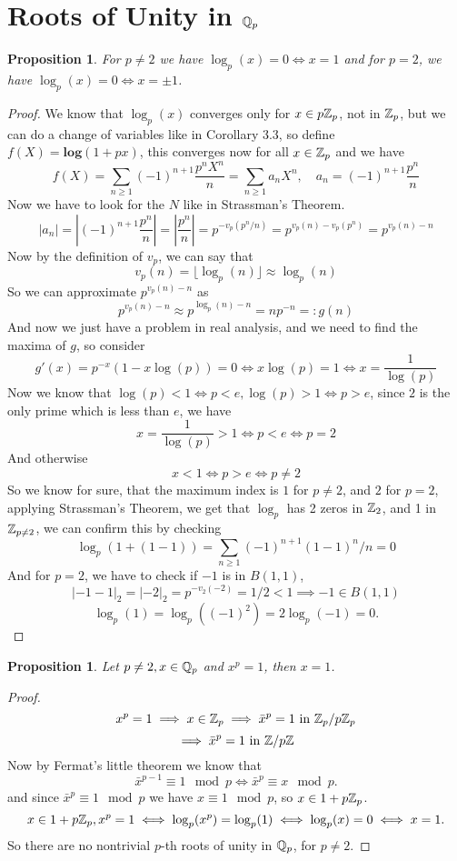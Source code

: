 \documentclass[a4paper]{article}
\theoremstyle{plain}
\newtheorem{prop}[thm]{Proposition}
\theoremstyle{definition}
\begin{document}
\section{Roots of Unity in $\Bbb Q_{p}$}
\begin{prop}
  For $p \neq 2$ we have $\log_{p}(x)=0 \iff x=1$ and for $p = 2$, we have $\log_{p}(x)=0 \iff x= \pm 1$.
\end{prop}
\begin{proof}
  We know that $\log_{p}(x)$ converges only for $x \in p\Bbb Z_{p}$, not in $\Bbb Z_{p}$, but we can do a change of variables like in Corollary 3.3, so define $f(X) = \mathbf{log}(1+px)$, this converges now for all $x \in \Bbb Z_{p}$ and we have
  $$f(X) = \sum_{n \geq 1} (-1)^{n+1}\frac{p^{n}X^{n}}n = \sum_{n \geq 1}a_{n}X^{n},\quad a_{n} = (-1)^{n+1}\frac{p^{n}}n$$
  Now we have to look for the $N$ like in Strassman's Theorem.
  $$|a_{n}| = \left|(-1)^{n+1}\frac{p^{n}}n \right| = \left|\frac{p^{n}}n \right| = p^{-v_{p}(p^{n}/n)} = p^{v_{p}(n) - v_{p}(p^{n})} = p^{v_{p}(n) - n}$$
  Now by the definition of $v_{p}$, we can say that
  $$ v_{p}(n) = \lfloor \log_{p}(n) \rfloor \approx \log_{p}(n)$$
  So we can approximate $p^{v_{p}(n) - n}$ as
  $$p^{v_{p}(n) - n} \approx p^{\log_{p}(n) - n} = np^{-n} =:g(n)$$
  And now we just have a problem in real analysis, and we need to find the maxima of $g$, so consider
  $$g'(x) = p^{-x}(1-x\log(p)) = 0 \iff x\log(p) = 1 \iff x = \frac{1}{\log(p)}$$
  Now we know that $\log(p) < 1 \iff p < e, \log(p) > 1 \iff p > e$, since $2$ is the only prime which is less than $e$, we have
  $$x = \frac{1}{\log(p)} > 1 \iff p < e \iff p = 2$$
  And otherwise
  $$x < 1 \iff p > e \iff p \neq 2$$
  So we know for sure, that the maximum index is $1$ for $p \neq 2$, and $2$ for $p = 2$, applying Strassman's Theorem, we get that $\log_{p}$ has 2 zeros in $\Bbb Z_{2}$, and 1 in $\Bbb Z_{p \neq 2}$, we can confirm this by checking
  $$\log_{p}(1+(1-1)) = \sum_{n \geq 1} (-1)^{n+1}(1-1)^{n}/n = 0$$
  And for $p = 2$, we have to check if $-1$ is in $B(1,1)$,
  $$|-1-1|_{2} = |-2|_{2} = p^{-v_{2}(-2)} = 1/2 < 1 \implies -1 \in B(1,1)$$
  $$\log_{p}(1) = \log_{p}((-1)^{2}) = 2 \log_{p}(-1)= 0.$$
\end{proof}
\begin{prop}
  Let $p \neq 2, x \in \Bbb Q_{p}$ and $x^{p}=1$, then $x=1$.
\end{prop}
\begin{proof}
  $$x^{p} = 1 \implies x \in \Bbb Z_{p} \implies \bar x^{p} = 1 \text{ in } \Bbb Z_{p}/p\Bbb Z_{p}$$
  $$\implies \bar x^{p} = 1 \text{ in } \Bbb Z/p\Bbb Z$$
  Now by Fermat's little theorem we know that
  $$\bar x^{p-1} \equiv 1 \mod p \iff \bar x^{p} \equiv x \mod p.$$
  and since $\bar x^{p} \equiv 1 \mod p$ we have $x \equiv 1 \mod p$, so $x \in 1+p\Bbb Z_{p}$.
  $$x \in 1+p\Bbb Z_{p}, x^{p} = 1 \iff \log_{p}(x^{p}) = \log_{p}(1) \iff \log_{p}(x) = 0 \iff x = 1.$$
  So there are no nontrivial $p$-th roots of unity in $\Bbb Q_{p}$, for $p \neq 2$.
\end{proof}
\end{document}
